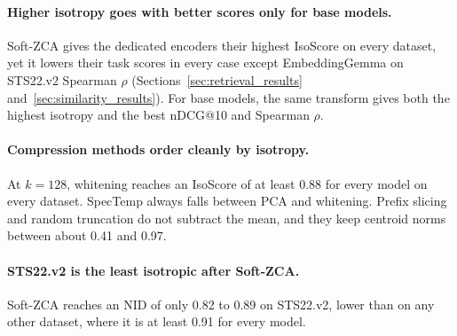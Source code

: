 \paragraph{Higher isotropy goes with better scores only for base models.}
Soft-ZCA gives the dedicated encoders their highest IsoScore on every dataset, yet it lowers their task scores in every case except EmbeddingGemma on STS22.v2 Spearman $\rho$ (Sections~\ref{sec:retrieval_results} and~\ref{sec:similarity_results}). For base models, the same transform gives both the highest isotropy and the best nDCG@10 and Spearman $\rho$.

\paragraph{Compression methods order cleanly by isotropy.}
At $k=128$, whitening reaches an IsoScore of at least 0.88 for every model on every dataset. SpecTemp always falls between PCA and whitening. Prefix slicing and random truncation do not subtract the mean, and they keep centroid norms between about 0.41 and 0.97.

\paragraph{STS22.v2 is the least isotropic after Soft-ZCA.}
Soft-ZCA reaches an NID of only 0.82 to 0.89 on STS22.v2, lower than on any other dataset, where it is at least 0.91 for every model.
